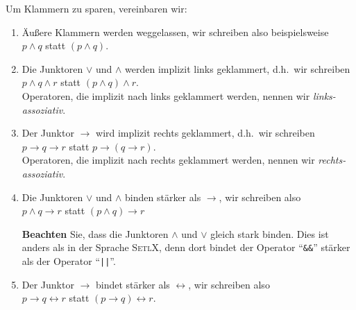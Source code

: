 \noindent
Um Klammern zu sparen, vereinbaren wir:
\begin{enumerate}
\item \"{A}u\ss{}ere Klammern werden weggelassen, wir schreiben also beispielsweise \\[0.2cm]
      \hspace*{1.3cm} $p \wedge q$ \quad statt \quad $(p \wedge q)$.
\item Die Junktoren  $\vee$ und $\wedge$ werden implizit links geklammert, d.h.~wir
      schreiben 
      \\[0.2cm]
      \hspace*{1.3cm} $p \wedge q \wedge r$ \quad statt \quad $(p \wedge q) \wedge r$.
      \\[0.2cm]
      Operatoren, die implizit nach links geklammert werden, nennen wir \emph{links-assoziativ}.
\item Der Junktor $\rightarrow$ wird implizit rechts geklammert, d.h.~wir
      schreiben \\[0.2cm]
      \hspace*{1.3cm} $p \rightarrow q \rightarrow r$ \quad statt \quad $p \rightarrow (q \rightarrow r)$.
      \\[0.2cm]
      Operatoren, die implizit nach rechts geklammert werden, nennen wir \emph{rechts-assoziativ}.
\item Die Junktoren $\vee$ und $\wedge$ binden st\"{a}rker als $\rightarrow$, wir schreiben
      also \\[0.2cm]
      \hspace*{1.3cm} $p \wedge q \rightarrow r$ \quad statt \quad $(p \wedge q) \rightarrow r$

      \textbf{Beachten} Sie, dass die Junktoren $\wedge$ und $\vee$ gleich stark binden.  Dies ist
      anders als in der Sprache \textsc{SetlX}, denn dort bindet der Operator ``\texttt{\&\&}'' st\"{a}rker als
      der Operator ``\texttt{||}''.
\item Der Junktor $\rightarrow$ bindet st\"{a}rker als $\leftrightarrow$, wir schreiben
      also \\[0.2cm]
      \hspace*{1.3cm} $p \rightarrow q \leftrightarrow r$ \quad statt \quad $(p \rightarrow q) \leftrightarrow r$.
\end{enumerate}

